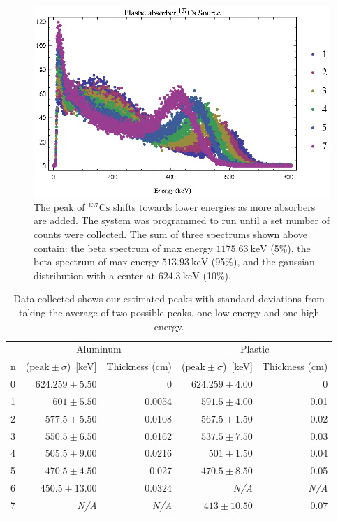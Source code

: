 \begin{figure}[tbp]
	\centering
		\includegraphics[width=\MyWidth]{Figures/plasticShiftsPlot.eps}
	\caption{The peak of $^{137}\text{Cs}$ shifts towards lower energies as more absorbers are added.  The system was programmed to run until a set number of counts were collected.  The sum of three spectrums shown above contain: the beta spectrum of max energy $1175.63~\text{keV}$ (5\%), the beta spectrum of max energy $513.93~\text{keV}$ (95\%), and the gaussian distribution with a center at $624.3~\text{keV}$ (10\%).}
	\label{fig:Figures_plasticShiftsPlot}
\end{figure}%
\begin{table}
	[tbp] 
	\begin{center}
		\begin{tabular}{lrrrr}
\toprule
 	 &  		\multicolumn{2}{c}{Aluminum} 			 & 			\multicolumn{2}{c}{Plastic} 				\\
\cmidrule(r){2-3}
\cmidrule(r){4-5}
n   & ($\text{peak}\pm\sigma$)~[keV] 	
	& Thickness (cm) 
	& ($\text{peak}\pm\sigma$)~[keV] 	
	& Thickness (cm) 	\\
\midrule
0    & $624.259	\pm	 5.50$					&	0	         &	$624.259\pm		 4.00$					&	0   			\\
1    & $601		\pm	 5.50$						&	0.0054		 &	$591.5\pm	 4.00$					&	0.01			\\
2    & $577.5	\pm	 5.50$					&	0.0108		 &	$567.5\pm	     1.50$					&	0.02			\\
3    & $550.5	\pm	 6.50$					&	0.0162		 &	$537.5\pm	     7.50$					&	0.03			\\
4    & $505.5	\pm	 9.00$					&	0.0216		 &	$501\pm	    	 1.50$						&	0.04			\\
5    & $470.5	\pm	 4.50$					&	0.027	     &	$470.5\pm	     8.50$					&	0.05			\\
6    & $450.5	\pm	13.00$					&	0.0324		 &	\textit{N/A}					&	\textit{N/A}	\\
7    & 	\textit{N/A}	    			&	\textit{N/A} &	$413\pm	    		10.50$						&	0.07  			\\
\bottomrule
		\end{tabular}
	\end{center}
	\caption{Data collected shows our estimated peaks with standard deviations from taking the average of two possible peaks, one low energy and one high energy.} \label{tab:dataCollected}
\end{table}%
